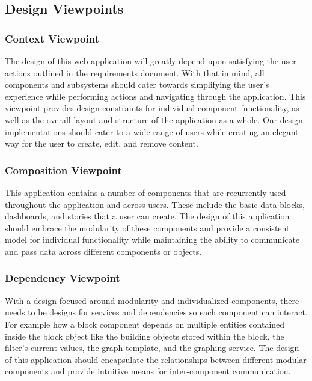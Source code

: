\documentclass[journal,10pt,onecolumn,compsoc]{IEEEtran}
\begin{document}
    \subsection{Design Viewpoints}
    \subsubsection{Context Viewpoint}
    The design of this web application will greatly depend upon satisfying the user actions outlined in the requirements document. With that in mind, all components and subsystems should cater towards simplifying the user's experience while performing actions and navigating through the application. This viewpoint provides design constraints for individual component functionality, as well as the overall layout and structure of the application as a whole. Our design implementations should cater to a wide range of users while creating an elegant way for the user to create, edit, and remove content.
    \subsubsection{Composition Viewpoint}
    This application contains a number of components that are recurrently used throughout the application and across users. These include the basic data blocks, dashboards, and stories that a user can create. The design of this application should embrace the modularity of these components and provide a consistent model for individual functionality while maintaining the ability to communicate and pass data across different components or objects. 
    
    \subsubsection{Dependency Viewpoint}
    With a design focused around modularity and individualized components, there needs to be designs for services and dependencies so each component can interact. For example how a block component depends on multiple entities contained inside the block object like the building objects stored within the block, the filter's current values, the graph template, and the graphing service. The design of this application should encapsulate the relationships between different modular components and provide intuitive means for inter-component communication.
\end{document}
